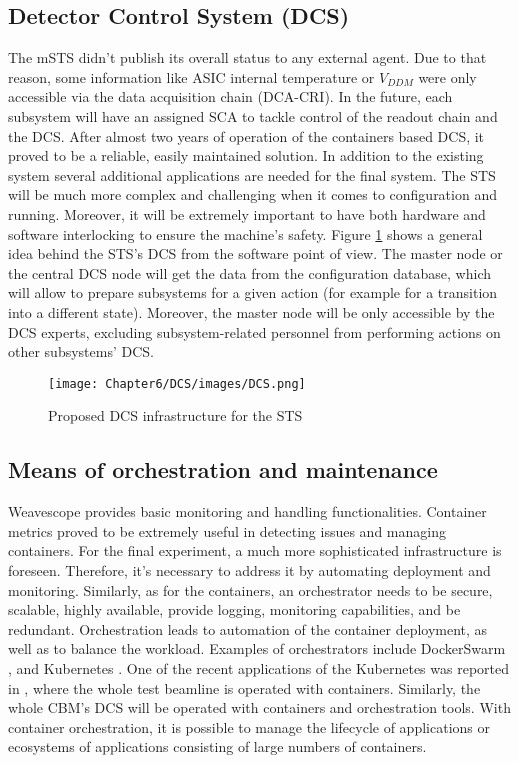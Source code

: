 \subsection{Detector Control System (DCS)}
The mSTS didn't publish its overall status to any external agent. Due to that reason, some information like \gls{ASIC} internal temperature or $V_{DDM}$ were only accessible via the data acquisition chain (\gls{DCA}-\gls{CRI}). In the future, each subsystem will have an assigned \gls{SCA} to tackle control of the readout chain and the DCS. After almost two years of operation of the containers based \gls{DCS}, it proved to be a reliable, easily maintained solution. In addition to the existing system several additional applications are needed for the final system. The STS will be much more complex and challenging when it comes to configuration and running. Moreover, it will be extremely important to have both hardware and software interlocking to ensure the machine's safety.
Figure \ref{fig_arch} shows a general idea behind the STS's DCS from the software point of view. The master node or the central DCS node will get the data from the configuration database, which will allow to prepare subsystems for a given action (for example for a transition into a different state). Moreover, the master node will be only accessible by the DCS experts, excluding subsystem-related personnel from performing actions on other subsystems' DCS. 

\begin{figure}[!h]
\centering
\texttt{[image: Chapter6/DCS/images/DCS.png]}
\caption{Proposed DCS infrastructure for the STS}
\label{fig_arch}
\end{figure}
\subsection{Means of orchestration and maintenance} 
Weavescope provides basic monitoring and handling functionalities. Container metrics proved to be extremely useful in detecting issues and managing containers. For the final experiment, a much more sophisticated infrastructure is foreseen. Therefore, it's necessary to address it by automating deployment and monitoring. Similarly, as for the containers, an orchestrator needs to be secure, scalable, highly available, provide logging, monitoring capabilities, and be redundant. Orchestration leads to automation of the container deployment, as well as to balance the workload. 
Examples of orchestrators include DockerSwarm \cite{DockerSwarm}, and Kubernetes \cite{Kubernetes}. One of the recent applications of the Kubernetes was reported in \cite{ICALEPCS2021:Diamond}, where the whole test beamline is operated with containers. Similarly, the whole CBM's DCS will be operated with containers and orchestration tools. 
With container orchestration, it is possible to manage the lifecycle of applications or ecosystems of applications consisting of large numbers of containers. 

